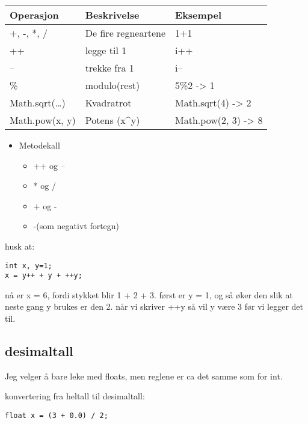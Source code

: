\documentclass[11pt]{article}
\begin{document}
\begin{center}
\begin{tabular}{lll}
\hline
 Operasjon            &  Beskrivelse          &  Eksempel             \\
\hline
 +, -, *, /           &  De fire regneartene  &  1+1                  \\
\hline
 ++                   &  legge til 1          &  i++                  \\
\hline
 --                   &  trekke fra 1         &  i--                  \\
\hline
 \%                   &  modulo(rest)         &  5\%2 -> 1            \\
\hline
 Math.sqrt(\ldots{})  &  Kvadratrot           &  Math.sqrt(4) -> 2    \\
\hline
 Math.pow(x, y)       &  Potens (x^y)         &  Math.pow(2, 3) -> 8  \\
\hline
\end{tabular}
\end{center}


  
   
\begin{itemize}
\item Metodekall
\begin{itemize}
\item ++ og --
\item * og /
\item + og -
\item -(som negativt fortegn)
\end{itemize}
\end{itemize}

   husk at:

\begin{verbatim}
int x, y=1;
x = y++ + y + ++y;
\end{verbatim}
   nå er x = 6, fordi stykket blir 1 + 2 + 3. først er y = 1, og 
   så øker den slik at neste gang y brukes er den 2. 
   når vi skriver ++y så vil y være 3 før vi legger det til.
\subsection{desimaltall}
\label{sec-1-2}


   Jeg velger å bare leke med floats, men reglene er ca det samme som for int.

   konvertering fra heltall til desimaltall:

\begin{verbatim}
float x = (3 + 0.0) / 2;
\end{verbatim}
\end{document}
